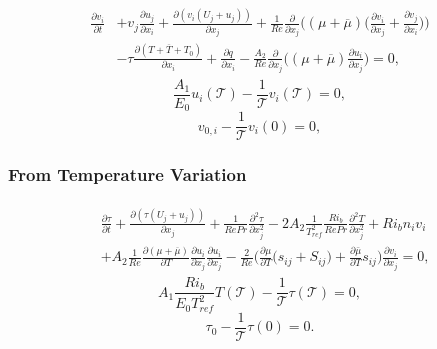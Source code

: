 \documentclass[preprint,12pt]{article}
\begin{document}
\begin{tcolorbox}
\begin{align}\label{eq:Adjoint_Momentum}\begin{split}
\frac{\partial v_i}{\partial t}&+v_j\frac{\partial u_j}{\partial x_i}+\frac{\partial (v_i(U_j+u_j))}{\partial x_j}+\frac{1}{Re}\frac{\partial}{\partial x_j}\Big(({\mu}+\overline{\mu})\Big(\frac{\partial v_i}{\partial x_j}+\frac{\partial v_j}{\partial x_i}\Big)\Big)\\&-\tau\frac{\partial (T+\overline{T}+T_0)}{\partial x_i}+\frac{\partial q}{\partial x_i}-\frac{A_2}{Re}\frac{\partial}{\partial x_j}\Big((\mu+\overline{\mu})\frac{\partial u_i}{\partial x_j}\Big)=0,
\end{split}
\end{align}
\begin{equation}\label{eq:Adjoint_Direct_final_velocity}
\frac{A_1}{E_0}u_i(\mathcal{T})-\frac{1}{\mathcal{T}}v_i(\mathcal{T})=0,
\end{equation}
\begin{equation}\label{eq:Adjoint_Direct_initial_velocity_1}
v_{0,i}-\frac{1}{\mathcal{T}}v_i(0)=0,
\end{equation}
\subsubsection*{From Temperature Variation}
\begin{align}\label{eq:Adjoint_scalar}\begin{split}
&\frac{\partial \tau}{\partial t}+\frac{\partial(\tau(U_j+u_j))}{\partial x_j}+\frac{1}{RePr}\frac{\partial^2\tau}{\partial x_j^2}-2A_2\frac{1}{T_{ref}^2}\frac{Ri_b}{Re Pr}\frac{\partial^2 T}{\partial x_j^2}+Ri_bn_iv_i\\&+A_2\frac{1}{Re}\frac{\partial (\mu+\overline{\mu})}{\partial T}\frac{\partial u_{i}}{\partial x_j}\frac{\partial u_{i}}{\partial x_j}-\frac{2}{Re}\Big(\frac{\partial\mu}{\partial T}\big(s_{ij}+S_{ij}\big)+\frac{\partial\bar{\mu}}{\partial T}s_{ij}\Big)\frac{\partial v_i}{\partial x_j}=0,
\end{split}
\end{align}
\begin{equation}\label{eq:Adjoint_Direct_final_temperature}
A_1\frac{Ri_b}{E_0T_{ref}^2} T(\mathcal{T})-\frac{1}{\mathcal{T}}\tau(\mathcal{T})=0,
\end{equation}
\begin{equation}\label{eq:Adjoint_Direct_initial_temperature_1}
\tau_0-\frac{1}{\mathcal{T}}\tau(0)=0.
\end{equation}

\end{tcolorbox}
\end{document}

